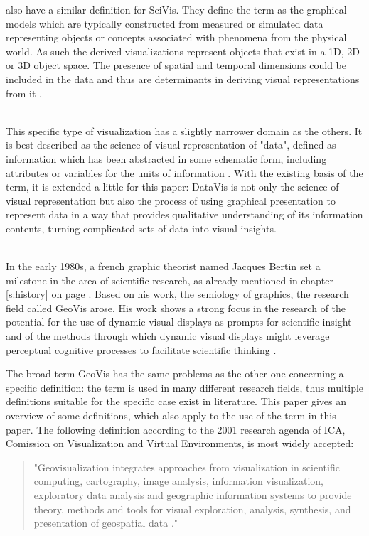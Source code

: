 \begin{enumerate}
\citeauthor{Ferreira2003} also have a similar definition for \ac{SciVis}. They define the term as the graphical models which are typically constructed from measured or simulated data representing objects or concepts associated with phenomena from the physical world. As such the derived visualizations represent objects that exist in a 1D, 2D or 3D object space. The presence of spatial and temporal dimensions could be included in the data and thus are determinants in deriving visual representations from it .

 \hfill \\
This specific type of visualization has a slightly narrower domain as the others. It is best described as the science of visual representation of "data", defined as information which has been abstracted in some schematic form, including attributes or variables for the units of information .
With the existing basis of the term, it is extended a little for this paper: \ac{DataVis} is not only the science of visual representation but also the process of using graphical presentation to represent data in a way that provides qualitative understanding of its information contents, turning complicated sets of data into visual insights.

 \hfill \\
In the early 1980s, a french graphic theorist named Jacques Bertin set a milestone in the area of scientific research, as already mentioned in chapter \ref{s:history} on page \pageref{crossref:bertain}. Based on his work, the semiology of graphics, the research field called \ac{GeoVis} arose. His work shows a strong focus in the research of the potential for the use of dynamic visual displays as prompts for scientific insight and of the methods through which dynamic visual displays might leverage perceptual cognitive processes to facilitate scientific thinking .

The broad term \ac{GeoVis} has the same problems as the other one concerning a specific definition: the term is used in many different research fields, thus multiple definitions suitable for the specific case exist in literature. This paper gives an overview of some definitions, which also apply to the use of the term in this paper.
The following definition according to the 2001 research agenda of \ac{ICA}, Comission on Visualization and Virtual Environments, is most widely accepted:
\begin{quote}
"Geovisualization integrates approaches from visualization in scientific computing, cartography, image analysis, information visualization, exploratory data analysis and geographic information systems to provide theory, methods and tools for visual exploration, analysis, synthesis, and presentation of geospatial data ."
\end{quote}


\end{enumerate}
